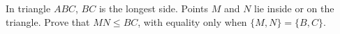 In triangle $ABC$, $BC$ is the longest side. Points $M$ and $N$ lie inside or on the triangle. Prove that $MN\le BC$, with equality only when $\{M,N\}=\{B,C\}$.
